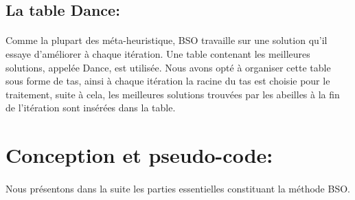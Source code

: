 	
	\subsection{La table Dance:}
	\paragraph{}
	Comme la plupart des méta-heuristique, BSO travaille sur une solution qu’il essaye d’améliorer à chaque itération. Une table contenant les meilleures solutions, appelée Dance, est utilisée. Nous avons opté à organiser cette table sous forme de tas, ainsi à chaque itération la racine du tas est choisie pour le traitement, suite à cela, les meilleures solutions trouvées par les abeilles à la fin de l’itération sont insérées dans la table.
	\section{Conception et pseudo-code:}
	\paragraph{}
	Nous présentons dans la suite les parties essentielles constituant la méthode BSO.
